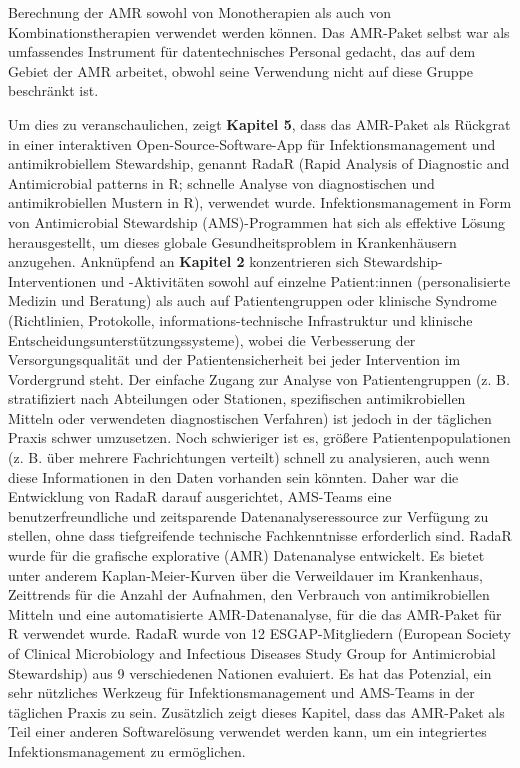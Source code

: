 \documentclass[
]{book}
\begin{document}
Berechnung der AMR sowohl von Monotherapien als auch von Kombinationstherapien verwendet werden können. Das AMR-Paket selbst war als umfassendes Instrument für datentechnisches Personal gedacht, das auf dem Gebiet der AMR arbeitet, obwohl seine Verwendung nicht auf diese Gruppe beschränkt ist.

Um dies zu veranschaulichen, zeigt \textbf{Kapitel 5}, dass das AMR-Paket als Rückgrat in einer interaktiven Open-Source-Software-App für Infektionsmanagement und antimikrobiellem Stewardship, genannt RadaR (Rapid Analysis of Diagnostic and Antimicrobial patterns in R; schnelle Analyse von diagnostischen und antimikrobiellen Mustern in R), verwendet wurde. Infektionsmanagement in Form von Antimicrobial Stewardship (AMS)-Programmen hat sich als effektive Lösung herausgestellt, um dieses globale Gesundheitsproblem in Krankenhäusern anzugehen. Anknüpfend an \textbf{Kapitel 2} konzentrieren sich Stewardship-Interventionen und -Aktivitäten sowohl auf einzelne Patient:innen (personalisierte Medizin und Beratung) als auch auf Patientengruppen oder klinische Syndrome (Richtlinien, Protokolle, informations-technische Infrastruktur und klinische Entscheidungsunterstützungssysteme), wobei die Verbesserung der Versorgungsqualität und der Patientensicherheit bei jeder Intervention im Vordergrund steht. Der einfache Zugang zur Analyse von Patientengruppen (z. B. stratifiziert nach Abteilungen oder Stationen, spezifischen antimikrobiellen Mitteln oder verwendeten diagnostischen Verfahren) ist jedoch in der täglichen Praxis schwer umzusetzen. Noch schwieriger ist es, größere Patientenpopulationen (z. B. über mehrere Fachrichtungen verteilt) schnell zu analysieren, auch wenn diese Informationen in den Daten vorhanden sein könnten. Daher war die Entwicklung von RadaR darauf ausgerichtet, AMS-Teams eine benutzerfreundliche und zeitsparende Datenanalyseressource zur Verfügung zu stellen, ohne dass tiefgreifende technische Fachkenntnisse erforderlich sind. RadaR wurde für die grafische explorative (AMR) Datenanalyse entwickelt. Es bietet unter anderem Kaplan-Meier-Kurven über die Verweildauer im Krankenhaus, Zeittrends für die Anzahl der Aufnahmen, den Verbrauch von antimikrobiellen Mitteln und eine automatisierte AMR-Datenanalyse, für die das AMR-Paket für R verwendet wurde. RadaR wurde von 12 ESGAP-Mitgliedern (European Society of Clinical Microbiology and Infectious Diseases Study Group for Antimicrobial Stewardship) aus 9 verschiedenen Nationen evaluiert. Es hat das Potenzial, ein sehr nützliches Werkzeug für Infektionsmanagement und AMS-Teams in der täglichen Praxis zu sein. Zusätzlich zeigt dieses Kapitel, dass das AMR-Paket als Teil einer anderen Softwarelösung verwendet werden kann, um ein integriertes Infektionsmanagement zu ermöglichen.
\end{document}
